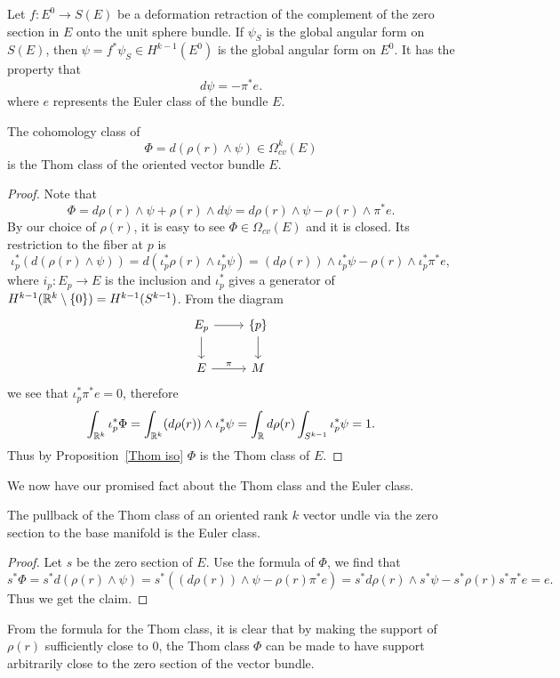 Let $f:E^0\to S(E)$ be a deformation retraction of the complement of the zero section in $E$ onto the unit sphere bundle. If $\psi_S$ is the global angular form on $S(E)$, 
then $\psi=f^*\psi_S\in H^{k-1}(E^0)$ is the global angular form on $E^0$. It has the property that
\[d\psi=-\pi^*e.\]
where $e$ represents the Euler class of the bundle $E$.
\begin{proposition}
The cohomology class of
\[\Phi=d(\rho(r)\wedge\psi)\in\Omega^k_{cv}(E)\]
is the Thom class of the oriented vector bundle $E$.
\end{proposition}
\begin{proof}
Note that
\[\Phi=d\rho(r)\wedge\psi+\rho(r)\wedge d\psi=d\rho(r)\wedge\psi-\rho(r)\wedge\pi^*e.\]
By our choice of $\rho(r)$, it is easy to see $\Phi\in\Omega_{cv}(E)$ and it is closed. Its restriction to the fiber at $p$ is 
\[\iota_p^*(d(\rho(r)\wedge\psi))=d(\iota_p^*\rho(r)\wedge\iota_p^*\psi)=(d\rho(r))\wedge\iota_p^*\psi-\rho(r)\wedge\iota_p^*\pi^*e,\]
where $i_p:E_p\to E$ is the inclusion and $\iota_p^*$ gives a generator of $H^{k-1}(\mathbb{R}^k\setminus\{0\})=H^{k-1}(S^{k-1})$. From the diagram
\[\begin{tikzcd}
E_p\ar[r]\ar[d]&\{p\}\ar[d]\\
E\ar[r,"\pi"]&M
\end{tikzcd}\]
we see that $\iota_p^*\pi^*e=0$, therefore
\[\int_{\mathbb{R}^k}\iota_p^*\Phi=\int_{\mathbb{R}^k}(d\rho(r))\wedge\iota_p^*\psi=\int_{\mathbb{R}}d\rho(r)\int_{S^{k-1}}\iota_p^*\psi=1.\]
Thus by Proposition~\ref{Thom iso} $\Phi$ is the Thom class of $E$.
\end{proof}
We now have our promised fact about the Thom class and the Euler class.
\begin{proposition}\label{Thom class pullback Euler class}
The pullback of the Thom class of an oriented rank $k$ vector undle via the zero section to the base manifold is the Euler class.
\end{proposition}
\begin{proof}
Let $s$ be the zero section of $E$. Use the formula of $\Phi$, we find that
\[s^*\Phi=s^*d(\rho(r)\wedge\psi)=s^*((d\rho(r))\wedge\psi-\rho(r)\pi^*e)=s^*d\rho(r)\wedge s^*\psi-s^*\rho(r)s^*\pi^*e=e.\]
Thus we get the claim.
\end{proof}
\begin{remark}
From the formula for the Thom class, it is clear that by making the support of $\rho(r)$ sufficiently close to $0$, the Thom class $\Phi$ can be made to have support 
arbitrarily close to the zero section of the vector bundle.
\end{remark}
